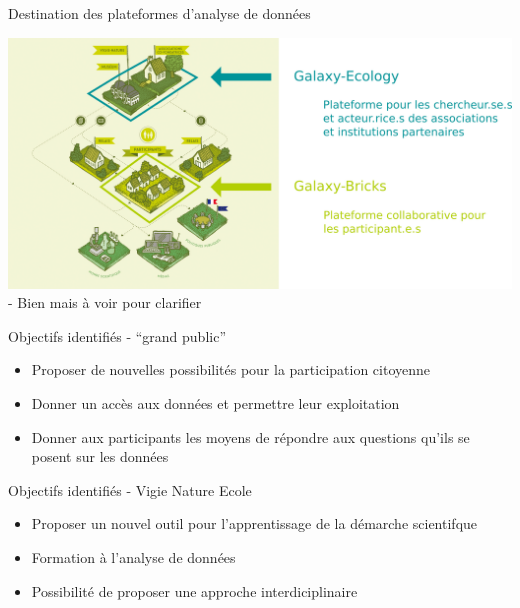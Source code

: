 \documentclass[ignorenonframetext,aspectratio=129]{beamer}
\providecommand{\tightlist}{%
  \setlength{\itemsep}{0pt}\setlength{\parskip}{0pt}}
\begin{document}
\begin{frame}{Destination des plateformes d'analyse de données}

\includegraphics{figures/Vigie-Nature-Network-fr.png} - Bien mais à voir
pour clarifier

\end{frame}

\begin{frame}{Objectifs identifiés - ``grand public''}

\begin{itemize}
\tightlist
\item
  Proposer de nouvelles possibilités pour la participation citoyenne
\item
  Donner un accès aux données et permettre leur exploitation
\item
  Donner aux participants les moyens de répondre aux questions qu'ils se
  posent sur les données
\end{itemize}

\end{frame}

\begin{frame}{Objectifs identifiés - Vigie Nature Ecole}

\begin{itemize}
\tightlist
\item
  Proposer un nouvel outil pour l'apprentissage de la démarche
  scientifque
\item
  Formation à l'analyse de données
\item
  Possibilité de proposer une approche interdiciplinaire
\end{itemize}

\end{frame}
\end{document}

